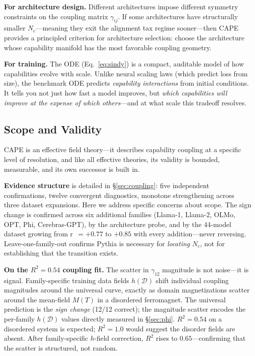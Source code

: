 \documentclass[11pt]{article}
\begin{document}
\textbf{For architecture design.}
Different architectures impose different symmetry constraints
on the coupling matrix $\gamma_{ij}$.
If some architectures have structurally smaller $N_c$---meaning
they exit the alignment tax regime sooner---then
CAPE provides a principled criterion for architecture selection:
choose the architecture whose capability manifold
has the most favorable coupling geometry.

\textbf{For training.}
The ODE (Eq.~\ref{eq:sindy}) is a compact, auditable model
of how capabilities evolve with scale.
Unlike neural scaling laws (which predict loss from size),
the benchmark ODE predicts \emph{capability interactions} from initial conditions.
It tells you not just how fast a model improves, but
\emph{which capabilities will improve at the expense of which others}---and
at what scale this tradeoff resolves.

\subsection{Scope and Validity}

CAPE is an effective field theory---it describes capability coupling at a specific level of resolution, and like all effective theories, its validity is bounded, measurable, and its own successor is built in.

\textbf{Evidence structure} is detailed in \S\ref{sec:coupling}: five independent confirmations, twelve convergent diagnostics, monotone strengthening across three dataset expansions.
Here we address specific concerns about scope.
The sign change is confirmed across six additional families (Llama-1, Llama-2, OLMo, OPT, Phi, Cerebras-GPT), by the architecture probe, and by the 44-model dataset growing from r~$=+0.77$ to $+0.85$ with every addition---never reversing.
Leave-one-family-out confirms Pythia is necessary for \emph{locating} $N_c$, not for establishing that the transition exists.

\textbf{On the $R^2 = 0.54$ coupling fit.}
The scatter in $\gamma_{12}$ magnitude is not noise---it is signal.
Family-specific training data fields $h(\mathcal{D})$ shift individual coupling magnitudes around the universal curve, exactly as domain magnetizations scatter around the mean-field $M(T)$ in a disordered ferromagnet.
The universal prediction is the \emph{sign change} (12/12 correct); the magnitude scatter encodes the per-family $h(\mathcal{D})$ values directly measured in \S\ref{sec:phi}.
$R^2 = 0.54$ on a disordered system is expected; $R^2 = 1.0$ would suggest the disorder fields are absent.
After family-specific $h$-field correction, $R^2$ rises to $0.65$---confirming that the scatter is structured, not random.
\end{document}
